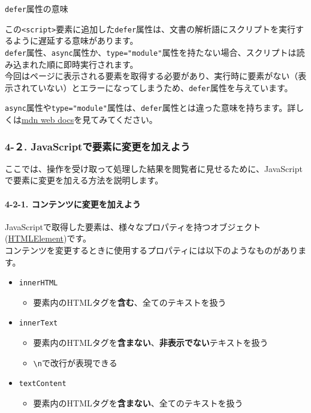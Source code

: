 \texttt{defer}属性の意味

この\texttt{\textless{}script\textgreater{}}要素に追加した\texttt{defer}属性は、文書の解析語にスクリプトを実行するように遅延する意味があります。\\
\texttt{defer}属性、\texttt{async}属性か、\texttt{type="module"}属性を持たない場合、スクリプトは読み込まれた順に即時実行されます。\\
今回はページに表示される要素を取得する必要があり、実行時に要素がない（表示されていない）とエラーになってしまうため、\texttt{defer}属性を与えています。

\texttt{async}属性や\texttt{type="module"}属性は、\texttt{defer}属性とは違った意味を持ちます。詳しくは\href{https://developer.mozilla.org/ja/docs/Web/HTML/Element/script\#\%E5\%B1\%9E\%E6\%80\%A7}{mdn
web docs}を見てみてください。

\subsubsection{4-２.
JavaScriptで要素に変更を加えよう}\label{javascriptux3067ux8981ux7d20ux306bux5909ux66f4ux3092ux52a0ux3048ux3088ux3046}

ここでは、操作を受け取って処理した結果を閲覧者に見せるために、JavaScriptで要素に変更を加える方法を説明します。

\paragraph{4-2-1.
コンテンツに変更を加えよう}\label{ux30b3ux30f3ux30c6ux30f3ux30c4ux306bux5909ux66f4ux3092ux52a0ux3048ux3088ux3046}

JavaScriptで取得した要素は、様々なプロパティを持つオブジェクト(\href{https://developer.mozilla.org/ja/docs/Web/API/HTMLElement}{HTMLElement})です。\\
コンテンツを変更するときに使用するプロパティには以下のようなものがあります。

\begin{itemize}
\tightlist
\item
  \texttt{innerHTML}

  \begin{itemize}
  \tightlist
  \item
    要素内のHTMLタグを\textbf{含む}、全てのテキストを扱う
  \end{itemize}
\item
  \texttt{innerText}

  \begin{itemize}
  \tightlist
  \item
    要素内のHTMLタグを\textbf{含まない}、\textbf{非表示でない}テキストを扱う
  \item
    \texttt{\textbackslash{}n}で改行が表現できる
  \end{itemize}
\item
  \texttt{textContent}

  \begin{itemize}
  \tightlist
  \item
    要素内のHTMLタグを\textbf{含まない}、全てのテキストを扱う
  \end{itemize}
\end{itemize}

